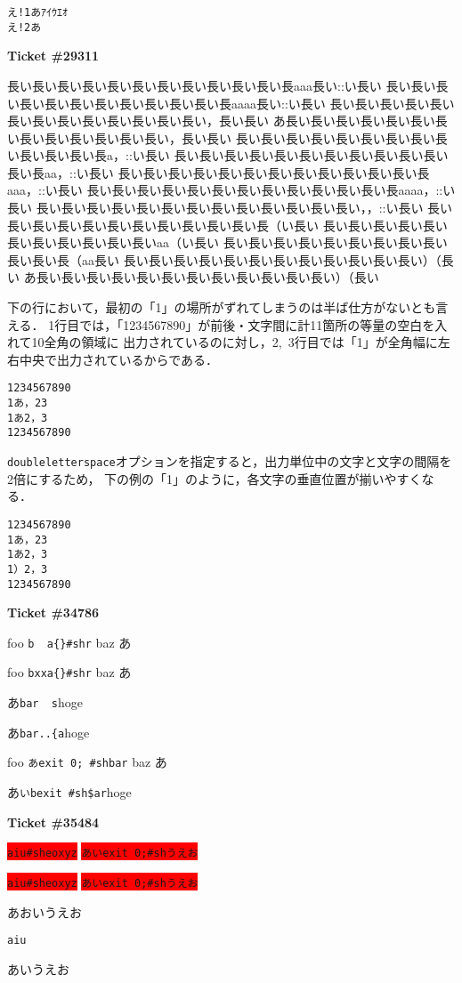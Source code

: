 \documentclass{jarticle}
\begin{document}
\begin{lstlisting}
え!1あｱｲｳｴｵ
え!2あ
\end{lstlisting}
\newpage
\textbf{Ticket \#29311}

\begin{env}{\relax}
長い長い長い長い長い長い長い長い長い長い長い長aaa長い::い長い
長い長い長い長い長い長い長い長い長い長い長い長aaaa長い::い長い
長い長い長い長い長い長い長い長い長い長い長い長い長い，長い長い
あ長い長い長い長い長い長い長い長い長い長い長い長い長い，長い長い
長い長い長い長い長い長い長い長い長い長い長い長い長a，::い長い
長い長い長い長い長い長い長い長い長い長い長い長い長aa，::い長い
長い長い長い長い長い長い長い長い長い長い長い長い長aaa，::い長い
長い長い長い長い長い長い長い長い長い長い長い長い長aaaa，::い長い
長い長い長い長い長い長い長い長い長い長い長い長い長い，，::い長い
長い長い長い長い長い長い長い長い長い長い長い長（い長い
長い長い長い長い長い長い長い長い長い長い長いaa（い長い
長い長い長い長い長い長い長い長い長い長い長い長（aa長い
長い長い長い長い長い長い長い長い長い長い長い長い）（長い
あ長い長い長い長い長い長い長い長い長い長い長い長い）（長い
\end{env}

下の行において，最初の「1」の場所がずれてしまうのは半ば仕方がないとも言える．
1行目では，「1234567890」が前後・文字間に計11箇所の等量の空白を入れて10全角の領域に
出力されているのに対し，2,~3行目では「1」が全角幅に左右中央で出力されているからである．
\begin{lstlisting}[escapechar=\%, basewidth=1em, basicstyle=\tt]
1234567890
1あ，23
1あ2，3
1234567890
\end{lstlisting}

\texttt{doubleletterspace}オプションを指定すると，出力単位中の文字と文字の間隔を2倍にするため，
下の例の「1」のように，各文字の垂直位置が揃いやすくなる．
\begin{lstlisting}[escapechar=\%,doubleletterspace, basewidth=1em, basicstyle=\tt]
1234567890
1あ，23
1あ2，3
1）2，3
1234567890
\end{lstlisting}


\newpage
\textbf{Ticket \#34786}

foo \lstinline[basicstyle=\tt]!b  a{}#shr! baz あ

foo \lstinline[basicstyle=\tt]!bxxa{}#shr! baz あ

あ\lstinline[basicstyle=\tt]{bar  s}hoge

あ\lstinline[basicstyle=\tt]{bar..{a}hoge

foo \lstinline[basicstyle=\tt\gtfamily]!あexit 0; #shbar! baz あ

あ\lstinline[basicstyle=\tt]{いbexit #sh$ar}hoge

\bigskip
\textbf{Ticket \#35484}

\colorbox{red}{\lstinline!aiu#sheoxyz!}
\colorbox{red}{\lstinline!あいexit 0;#shうえお!}


\colorbox{red}{\lstinline{aiu#sheoxyz}}
\colorbox{red}{\lstinline{あいexit 0;#shうえお}}

あおいうえお
\begin{lstlisting}[frame=single]
aiu
\end{lstlisting}
あいうえお
\end{document}
